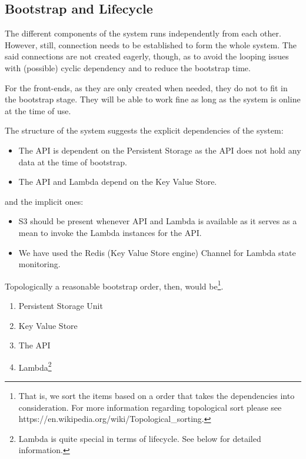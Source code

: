 
\subsection{Bootstrap and Lifecycle}

The different components of the system runs independently from each other. However, still, connection needs to be established to form the whole system. The said connections are not created eagerly, though, as to avoid the looping issues with (possible) cyclic dependency and to reduce the bootstrap time.

For the front-ends, as they are only created when needed, they do not to fit in the bootstrap stage. They will be able to work fine as long as the system is online at the time of use. 

The structure of the system suggests the explicit dependencies of the system:

\begin{itemize}
	\item The API is dependent on the Persistent Storage as the API does not hold any data at the time of bootstrap.
	\item The API and Lambda depend on the Key Value Store.
\end{itemize}

and the implicit ones:

\begin{itemize}
	\item S3 should be present whenever API and Lambda is available as it serves as a mean to invoke the Lambda instances for the API.
	\item We have used the Redis (Key Value Store engine) Channel for Lambda state monitoring.
\end{itemize}

Topologically a reasonable bootstrap order, then, would be\footnote{That is, we sort the items based on a order that takes the dependencies into consideration. For more information regarding topological sort please see https://en.wikipedia.org/wiki/Topological\_sorting.}.

\begin{enumerate}
	\item[1] Persistent Storage Unit
	\item[1] Key Value Store
	\item[2] The API
	\item[3] Lambda\footnote{Lambda is quite special in terms of lifecycle. See below for detailed information.}
\end{enumerate}

